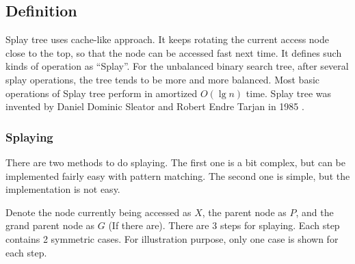 \documentclass{article}
\begin{document}
\subsection{Definition}

Splay tree uses cache-like approach. It keeps rotating the current
access node close to the top, so that the node can be accessed fast
next time. It defines such kinds of operation as ``Splay''. For the
unbalanced binary search tree, after several splay operations, the
tree tends to be more and more balanced. Most basic operations of
Splay tree perform in amortized $O(\lg n)$ time. Splay tree was invented
by Daniel Dominic Sleator and Robert Endre Tarjan in 1985\cite{wiki-splay-tree}
\cite{self-adjusting-trees}.

\subsubsection{Splaying}

There are two methods to do splaying. The first one is
a bit complex, but can be implemented fairly easy with
pattern matching. The second one is simple, but the implementation
is not easy.

Denote the node currently being accessed as $X$, the parent node as $P$,
and the grand parent node as $G$ (If there are).  There are 3 steps for
splaying. Each step contains 2 symmetric cases. For illustration
purpose, only one case is shown for each step.
\end{document}
